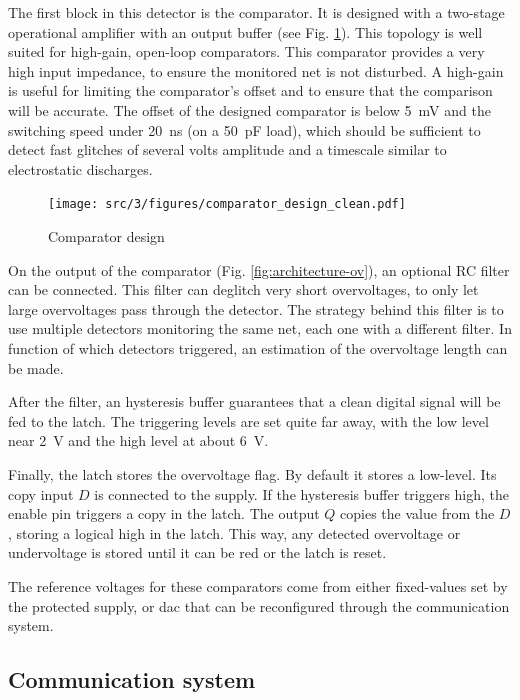 The first block in this detector is the comparator.
It is designed with a two-stage operational amplifier with an output buffer (see Fig. \ref{fig:comparator-design}).
This topology is well suited for high-gain, open-loop comparators.
This comparator provides a very high input impedance, to ensure the monitored net is not disturbed.
A high-gain is useful for limiting the comparator's offset and to ensure that the comparison will be accurate.
The offset of the designed comparator is below \SI{5}{\milli\volt} and the switching speed under \SI{20}{\nano\second} (on a \SI{50}{\pico\farad} load), which should be sufficient to detect fast glitches of several volts amplitude and a timescale similar to electrostatic discharges.

\begin{figure}[!h]
  \centering
  \texttt{[image: src/3/figures/comparator\_design\_clean.pdf]}
  \caption{Comparator design}
  \label{fig:comparator-design}
\end{figure}

On the output of the comparator (Fig. \ref{fig:architecture-ov}), an optional RC filter can be connected.
This filter can deglitch very short overvoltages, to only let large overvoltages pass through the detector.
The strategy behind this filter is to use multiple detectors monitoring the same net, each one with a different filter.
In function of which detectors triggered, an estimation of the overvoltage length can be made.

After the filter, an hysteresis buffer guarantees that a clean digital signal will be fed to the latch.
The triggering levels are set quite far away, with the low level near \SI{2}{\volt} and the high level at about \SI{6}{\volt}.

Finally, the latch stores the overvoltage flag.
By default it stores a low-level.
Its copy input $D$ is connected to the supply.
If the hysteresis buffer triggers high, the enable pin triggers a copy in the latch.
The output $Q$ copies the value from the $D$, storing a logical high in the latch.
This way, any detected overvoltage or undervoltage is stored until it can be red or the latch is reset.

The reference voltages for these comparators come from either fixed-values set by the protected supply, or \gls{dac} that can be reconfigured through the communication system.

\subsection{Communication system}
\label{sec:comm-system-testchip}

